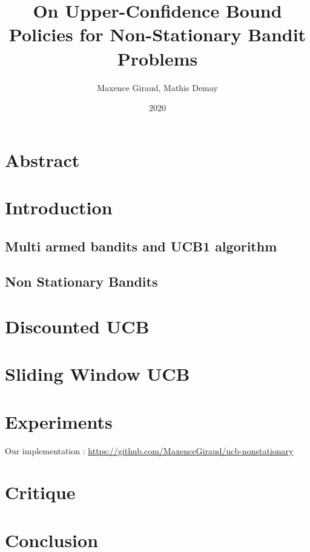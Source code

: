 \documentclass{article}
\title{On Upper-Confidence Bound Policies for Non-Stationary Bandit Problems}
\author{Maxence Giraud, Mathis Demay}
\date{2020}
\begin{document}
\maketitle

\section*{Abstract}

	

\section{Introduction}

	\subsection{Multi armed bandits and UCB1 algorithm}

		

	\subsection{Non Stationary Bandits}

		

\section{Discounted UCB}
	

\section{Sliding Window UCB}

	

\section{Experiments}
Our implementation : \url{https://github.com/MaxenceGiraud/ucb-nonstationary} 

\section{Critique}

\section{Conclusion}


\end{document}

